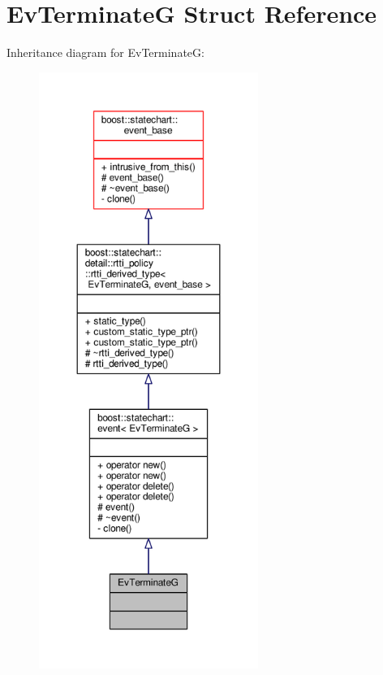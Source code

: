 \hypertarget{struct_ev_terminate_g}{}\section{Ev\+TerminateG Struct Reference}
\label{struct_ev_terminate_g}


Inheritance diagram for Ev\+TerminateG\+:
\nopagebreak
\begin{figure}[H]
\begin{center}
\leavevmode
\includegraphics[height=550pt]{struct_ev_terminate_g__inherit__graph}
\end{center}
\end{figure}


